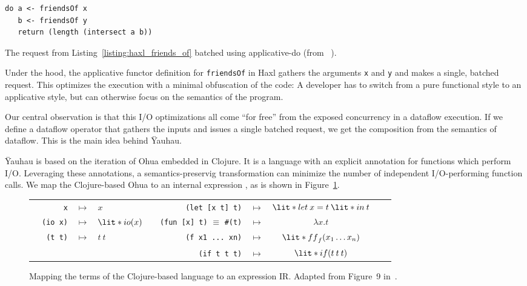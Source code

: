 \begin{listing}
\begin{verbatim}
do a <- friendsOf x
   b <- friendsOf y
   return (length (intersect a b))
\end{verbatim}
\caption{The request from Listing~\ref{listing:haxl_friends_of} batched using applicative-do (from ~\cite{marlow2014haxl}).}
\label{listing:haxl_applicative_do}
\end{listing}

Under the hood, the applicative functor definition for \texttt{friendsOf} in Haxl gathers the arguments \texttt{x} and \texttt{y} and makes a single, batched request.
This optimizes the execution with a minimal obfuscation of the code:
A developer has to switch from a pure functional style to an applicative style, but can otherwise focus on the semantics of the program.

Our central observation is that this \ac{I/O} optimizations all come ``for free'' from the exposed concurrency in a dataflow execution. 
If we define a dataflow operator that gathers the inputs and issues a single batched request, we get the composition from the semantics of dataflow.
This is the main idea behind \"{Y}auhau.


\"{Y}auhau is based on the iteration of Ohua embedded in Clojure.
It is a language with an explicit annotation for functions which perform \ac{I/O}.
Leveraging these annotations, a semantics-preservig transformation can minimize the number of independent \ac{I/O}-performing function calls.
We map the Clojure-based Ohua to an internal expression , as is shown in Figure~\ref{fig:clojure_to_yauhau}.

\begin{figure}[h]
	\centering
	\begin{tabular}{r r c l r r r c l r}
		&\texttt{x} & $\mapsto$ & $x$ &  &\texttt{(let [x t] t)} & $\mapsto$ & $\lit*{let} \: x = t \: \lit*{in} \: t$ &  \\

	&\texttt{(io x)}&$\mapsto$& $\lit*{io}(x)$ & &\texttt{(fun [x] t)} $\equiv$ \texttt{#(t)} & $\mapsto$ & $\lambda x.t$ &\\ 
	&\texttt{(t t)} & $\mapsto$ & $t \: t$ &	 &\texttt{(f x1 ... xn)} & $\mapsto$ & $\lit*{ff}_f(x_1 \ldots x_n)$ & \\
    & & & & &	\texttt{(if t t t)} & $\mapsto$ & $\lit*{if}(t \: t \: t)$  	%
	\end{tabular}
	
	\caption{Mapping the terms of the Clojure-based language to an expression \acs{IR}. Adapted from Figure~9 in~\cite{ertel_cc18}.}
	\label{fig:clojure_to_yauhau}
\end{figure}

